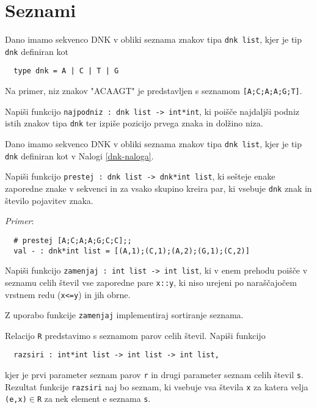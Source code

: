 \section{Seznami}

\begin{ex}
  \label{dnk-naloga}
  Dano imamo sekvenco DNK v obliki seznama znakov tipa \texttt{dnk list},
  kjer je tip \texttt{dnk} definiran kot

  \begin{verbatim}
  type dnk = A | C | T | G
  \end{verbatim}
 
  Na primer, niz znakov "ACAAGT" je predstavljen s seznamom 
  \texttt{[A;\-C;A;A;G;T]}. 

  Napi\v si funkcijo \texttt{najpodniz : dnk list -> int*int}, ki
  poi\v s\v ce najdalj\v si podniz istih znakov tipa \texttt{dnk} ter
  izpi\v se pozicijo prvega znaka in dol\v zino niza.


\end{ex} 
\begin{ex}
  Dano imamo sekvenco DNK v obliki seznama znakov tipa \texttt{dnk list},
  kjer je tip \texttt{dnk} definiran kot v Nalogi \ref{dnk-naloga}.

  Napi\v si funkcijo \texttt{prestej : dnk list -> dnk*int list}, ki
  se\v steje enake zaporedne znake v sekvenci in za vsako skupino
  kreira par, ki vsebuje \texttt{dnk} znak in \v stevilo pojavitev
  znaka.

  \emph{Primer}: 
  \begin{verbatim}
  # prestej [A;C;A;A;G;C;C];;
  val - : dnk*int list = [(A,1);(C,1);(A,2);(G,1);(C,2)]
  \end{verbatim}


\end{ex} 
\begin{ex}
  Napi\v si funkcijo \texttt{zamenjaj : int list -> int list}, ki v
  enem prehodu poi\v s\v ce v seznamu celih \v stevil vse zaporedne
  pare \texttt{x::y}, ki niso urejeni po nara\v s\v cajo\v cem vrstnem
  redu (\texttt{x<=y}) in jih obrne.

  Z uporabo funkcije \texttt{zamenjaj} implementiraj sortiranje seznama.


\end{ex} 
\begin{ex}
  Relacijo \texttt{R} predstavimo s seznamom parov celih \v
  stevil. Napi\v si funkcijo

  \begin{verbatim}
  razsiri : int*int list -> int list -> int list,
  \end{verbatim}

  kjer je prvi parameter seznam parov \texttt{r} in drugi parameter
  seznam celih \v stevil \texttt{s}. Rezultat funkcije
  \texttt{razsiri} naj bo seznam, ki vsebuje vsa \v stevila \texttt{x}
  za katera velja \texttt{(e,x)}$\in$\texttt{R} za nek element e
  seznama \texttt{s}.


\end{ex} 
